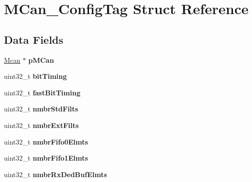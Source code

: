 \hypertarget{structMCan__ConfigTag}{}\section{M\+Can\+\_\+\+Config\+Tag Struct Reference}
\label{structMCan__ConfigTag}
\subsection*{Data Fields}
\begin{DoxyCompactItemize}
\item 
\mbox{\label{structMCan__ConfigTag_a29cb88538dec6963f621f5e9ecc96ea2}} 
\mbox{\hyperlink{structMcan}{Mcan}} $\ast$ {\bfseries p\+M\+Can}
\item 
\mbox{\label{structMCan__ConfigTag_a5ba276cbe7f44dbb7b9a0b06e835b94c}} 
uint32\+\_\+t {\bfseries bit\+Timing}
\item 
\mbox{\label{structMCan__ConfigTag_a510bb8af5d3edeaa2921afa9206de1af}} 
uint32\+\_\+t {\bfseries fast\+Bit\+Timing}
\item 
\mbox{\label{structMCan__ConfigTag_a6ae715cbd166fc6df8d269131e099f1c}} 
uint32\+\_\+t {\bfseries nmbr\+Std\+Filts}
\item 
\mbox{\label{structMCan__ConfigTag_a13276f12217ac7f01d0b5c0ad4210d8d}} 
uint32\+\_\+t {\bfseries nmbr\+Ext\+Filts}
\item 
\mbox{\label{structMCan__ConfigTag_a8bcaa04a9a46609f4b8615ee78860697}} 
uint32\+\_\+t {\bfseries nmbr\+Fifo0\+Elmts}
\item 
\mbox{\label{structMCan__ConfigTag_ae46484e5ba5118ccf935cf3c910c81d2}} 
uint32\+\_\+t {\bfseries nmbr\+Fifo1\+Elmts}
\item 
\mbox{\label{structMCan__ConfigTag_a836970283c8252a36b6295f3a56b5ca9}} 
uint32\+\_\+t {\bfseries nmbr\+Rx\+Ded\+Buf\+Elmts}
\item 
\mbox{\label{structMCan__ConfigTag_ad88830d1163db61df7cc29837a7c2480}} 

\end{DoxyCompactItemize}
